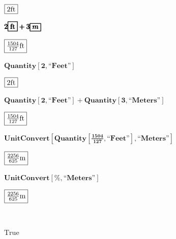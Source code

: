 \documentclass{article}
\begin{document}
\(\)

\begin{doublespace}
\noindent\(\fbox{$2\text{ft}$}\)
\end{doublespace}

\begin{doublespace}
\noindent\(\pmb{2\fbox{$\text{ft}$}+3\fbox{$m$}}\)
\end{doublespace}

\begin{doublespace}
\noindent\(\fbox{$\frac{1504}{127}\text{ft}$}\)
\end{doublespace}

\begin{doublespace}
\noindent\(\pmb{\text{Quantity}[2,\text{{``}Feet{''}}]}\)
\end{doublespace}

\begin{doublespace}
\noindent\(\fbox{$2\text{ft}$}\)
\end{doublespace}

\begin{doublespace}
\noindent\(\pmb{\text{Quantity}[2,\text{{``}Feet{''}}]+\text{Quantity}[3,\text{{``}Meters{''}}]}\)
\end{doublespace}

\begin{doublespace}
\noindent\(\fbox{$\frac{1504}{127}\text{ft}$}\)
\end{doublespace}

\begin{doublespace}
\noindent\(\pmb{\text{UnitConvert}\left[\text{Quantity}\left[\frac{1504}{127},\text{{``}Feet{''}}\right],\text{{``}Meters{''}}\right]}\)
\end{doublespace}

\begin{doublespace}
\noindent\(\fbox{$\frac{2256}{625}\text{m}$}\)
\end{doublespace}

\begin{doublespace}
\noindent\(\pmb{\text{UnitConvert}[\%,\text{{``}Meters{''}}]}\)
\end{doublespace}

\begin{doublespace}
\noindent\(\fbox{$\frac{2256}{625}\text{m}$}\)
\end{doublespace}

\(\)

\begin{doublespace}
\noindent\(\text{True}\)
\end{doublespace}
\end{document}
